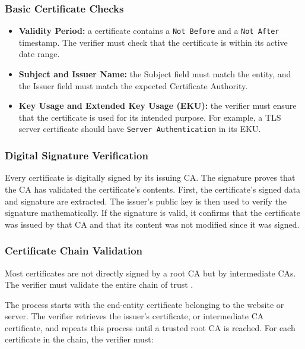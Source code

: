 \documentclass[10pt,twocolumn]{article}
\begin{document}
\subsubsection{Basic Certificate Checks}

\begin{itemize}
  \item \textbf{Validity Period:} a certificate contains a \texttt{Not Before}
        and a \texttt{Not After} timestamp. The verifier must check that the
        certificate is within its active date range.
  \item \textbf{Subject and Issuer Name:} the Subject field must match the
        entity, and the Issuer field must match the expected Certificate
        Authority.
  \item \textbf{Key Usage and Extended Key Usage (EKU):} the verifier must
        ensure that the certificate is used for its intended purpose. For
        example, a TLS server certificate should have \texttt{Server
        Authentication} in its EKU.
\end{itemize}

\subsubsection{Digital Signature Verification}


Every certificate is digitally signed by its issuing CA. The signature proves
that the CA has validated the certificate's contents. First, the certificate's
signed data and signature are extracted. The issuer's public key is then used
to verify the signature mathematically. If the signature is valid, it confirms
that the certificate was issued by that CA and that its content was not
modified since it was signed.

\subsubsection{Certificate Chain Validation}

Most certificates are not directly signed by a root CA but by intermediate
CAs. The verifier must validate the entire chain of trust \cite{rfc5280}.

The process starts with the end-entity certificate belonging to the
website or server. The verifier retrieves the issuer's certificate, or
intermediate CA certificate, and repeats this process until a trusted root CA
is reached. For each certificate in the chain, the verifier must:
\end{document}
